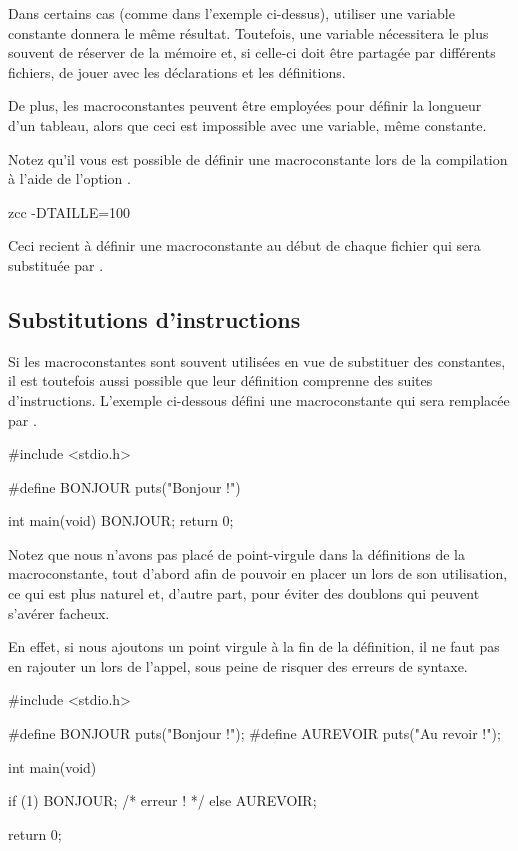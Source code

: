 Dans certains cas (comme dans l'exemple ci-dessus), utiliser une
variable constante donnera le même résultat. Toutefois, une variable
nécessitera le plus souvent de réserver de la mémoire et, si celle-ci
doit être partagée par différents fichiers, de jouer avec les
déclarations et les définitions.

De plus, les macroconstantes peuvent être employées pour définir la
longueur d'un tableau, alors que ceci est impossible avec une variable,
même constante.

\begin{infobox}
  Notez qu'il vous est possible de
définir une macroconstante lors de la compilation à l'aide de l'option
.
\begin{C}
 zcc -DTAILLE=100
\end{C}
Ceci recient à définir une macroconstante
 au début de chaque fichier qui sera substituée par
.
\end{infobox}


\subsection{Substitutions d'instructions}
\label{substitutions-dinstructions}

Si les macroconstantes sont souvent utilisées en vue de substituer des
constantes, il est toutefois aussi possible que leur définition
comprenne des suites d'instructions. L'exemple ci-dessous défini une
macroconstante  qui sera remplacée par
.

\begin{C}
#include <stdio.h>

#define BONJOUR  puts("Bonjour !")

int main(void)
{
    BONJOUR;
    return 0;
}
\end{C}

Notez que nous n'avons pas placé de point-virgule dans la définitions de
la macroconstante, tout d'abord afin de pouvoir en placer un lors de son
utilisation, ce qui est plus naturel et, d'autre part, pour éviter des
doublons qui peuvent s'avérer facheux.

En effet, si nous ajoutons un point virgule à la fin de la définition,
il ne faut pas en rajouter un lors de l'appel, sous peine de risquer des
erreurs de syntaxe.

\begin{C}
#include <stdio.h>

#define BONJOUR puts("Bonjour !");
#define AUREVOIR puts("Au revoir !");

int main(void)
{
    if (1)
        BONJOUR; /* erreur ! */
    else
        AUREVOIR;

    return 0;
}
\end{C}

